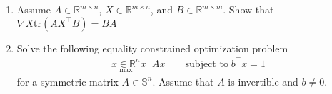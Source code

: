 \documentclass[12pt]{article}
\begin{document}
\begin{enumerate}
    \item Assume $A \in \mathbb{R}^{m \times n} $, $X \in \mathbb{R}^{m \times n} $, and $B \in \mathbb{R}^{m \times m} $. Show that $\nabla X \textrm{tr}(AX^\intercal B) = BA$
    
    \item Solve the following equality constrained optimization problem
    \begin{align*}
        \underset{\textrm{max}}{x \in \mathbb{R}^n} x^\intercal Ax \qquad \textrm{subject to} \; b^\intercal x=1
    \end{align*}
    for a symmetric matrix $A \in \mathbb{S}^n $. Assume that $A$ is invertible and $b \neq 0$. 

\end{enumerate}
\end{document}
